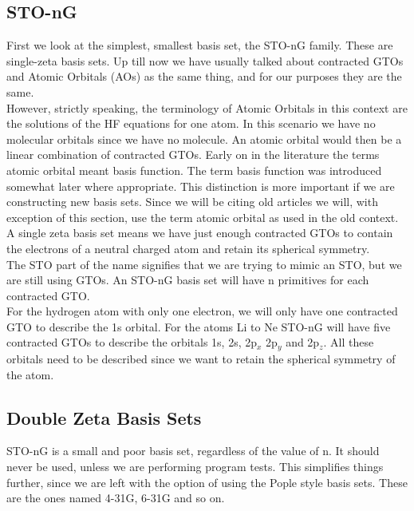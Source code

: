 \documentclass[a4paper,norsk,11pt,twoside]{report}
\begin{document}
\subsection{STO-nG}
First we look at the simplest, smallest basis set, the STO-nG
family. These are single-zeta basis sets. Up till now we have usually
talked about contracted GTOs and Atomic Orbitals (AOs) as the same thing,
and for our purposes they are the same. \\

However, strictly speaking, the terminology of Atomic Orbitals in this
context are the solutions of the HF equations for one atom. In this
scenario we have no molecular orbitals since we have no molecule. An
atomic orbital would then be a linear combination of contracted
GTOs. Early on in the literature the terms atomic orbital meant basis
function. The term basis function was introduced somewhat later where
appropriate. This distinction is more important if we are constructing
new basis sets. Since we will be citing old articles we will, with
exception of this section, use the term atomic orbital as used in the old context. \\

A single zeta basis set means we have just enough contracted GTOs to
contain the electrons of a neutral charged atom and retain its
spherical symmetry. \\

The STO part of the name signifies that we are trying to mimic an STO,
but we are still using GTOs. An STO-nG basis set will have n
primitives for each contracted GTO.\\

For the hydrogen atom with only one electron, we will only have one
contracted GTO to describe the 1s orbital. For the atoms Li to Ne STO-nG
will have five contracted GTOs to describe the orbitals 1s, 2s, 2p$_x$
2p$_y$ and 2p$_z$. All these orbitals need to be described since we want to retain the spherical symmetry of the atom. 

\subsection{Double Zeta Basis Sets}
STO-nG is a small and poor basis set, regardless of the value of n. It
should never be used, unless we are performing program tests. This
simplifies things further, since we are left with the option of using
the Pople style basis sets. These are the ones named 4-31G, 6-31G and
so on. \\
\end{document}
